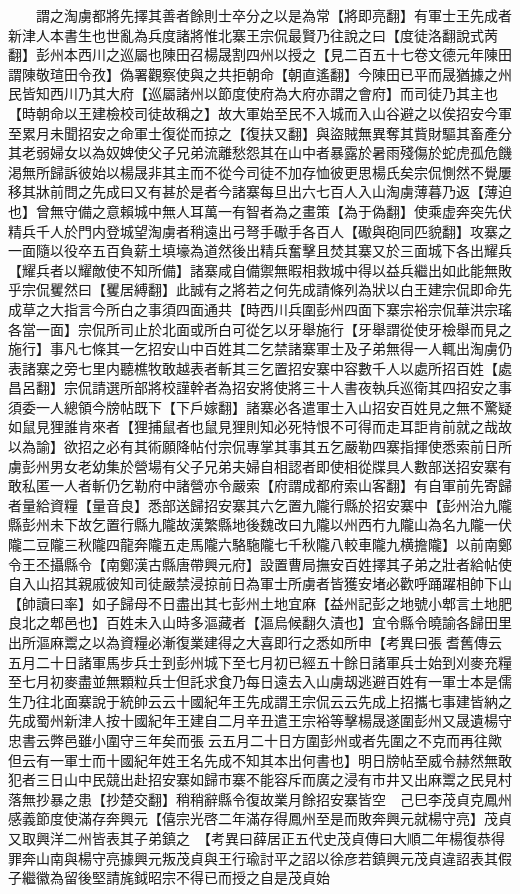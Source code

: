 　　謂之淘虜都將先擇其善者餘則士卒分之以是為常【將即亮翻】有軍士王先成者新津人本書生也世亂為兵度諸將惟北寨王宗侃最賢乃往說之曰【度徒洛翻說式苪翻】彭州本西川之巡屬也陳田召楊晟割四州以授之【見二百五十七卷文德元年陳田謂陳敬瑄田令孜】偽署觀察使與之共拒朝命【朝直遙翻】今陳田已平而晟猶據之州民皆知西川乃其大府【巡屬諸州以節度使府為大府亦謂之會府】而司徒乃其主也【時朝命以王建檢校司徒故稱之】故大軍始至民不入城而入山谷避之以俟招安今軍至累月未聞招安之命軍士復從而掠之【復扶又翻】與盜賊無異奪其貲財驅其畜產分其老弱婦女以為奴婢使父子兄弟流離愁怨其在山中者暴露於暑雨殘傷於蛇虎孤危饑渇無所歸訴彼始以楊晟非其主而不從今司徒不加存恤彼更思楊氏矣宗侃惻然不覺屢移其牀前問之先成曰又有甚於是者今諸寨每旦出六七百人入山淘虜薄暮乃返【薄迫也】曾無守備之意賴城中無人耳萬一有智者為之畫策【為于偽翻】使乘虚奔突先伏精兵千人於門内登城望淘虜者稍遠出弓弩手礮手各百人【礮與砲同匹貌翻】攻寨之一面隨以役卒五百負薪土填壕為道然後出精兵奮擊且焚其寨又於三面城下各出耀兵【耀兵者以耀敵使不知所備】諸寨咸自備禦無暇相救城中得以益兵繼出如此能無敗乎宗侃矍然曰【矍居縛翻】此誠有之將若之何先成請條列為狀以白王建宗侃即命先成草之大指言今所白之事須四面通共【時西川兵圍彭州四面下寨宗裕宗侃華洪宗瑤各當一面】宗侃所司止於北面或所白可從乞以牙舉施行【牙舉謂從使牙檢舉而見之施行】事凡七條其一乞招安山中百姓其二乞禁諸寨軍士及子弟無得一人輒出淘虜仍表諸寨之旁七里内聽樵牧敢越表者斬其三乞置招安寨中容數千人以處所招百姓【處昌呂翻】宗侃請選所部將校謹幹者為招安將使將三十人書夜執兵巡衛其四招安之事須委一人總領今牓帖既下【下戶嫁翻】諸寨必各遣軍士入山招安百姓見之無不驚疑如鼠見狸誰肯來者【狸捕鼠者也鼠見狸則知必死特恨不可得而走耳詎肯前就之哉故以為諭】欲招之必有其術願降帖付宗侃專掌其事其五乞嚴勒四寨指揮使悉索前日所虜彭州男女老幼集於營場有父子兄弟夫婦自相認者即使相從牒具人數部送招安寨有敢私匿一人者斬仍乞勒府中諸營亦令嚴索【府謂成都府索山客翻】有自軍前先寄歸者量給資糧【量音良】悉部送歸招安寨其六乞置九隴行縣於招安寨中【彭州治九隴縣彭州未下故乞置行縣九隴故漢繁縣地後魏改曰九隴以州西冇九隴山為名九隴一伏隴二豆隴三秋隴四龍奔隴五走馬隴六駱駞隴七千秋隴八較車隴九横擔隴】以前南鄭令王丕攝縣令【南鄭漢古縣唐帶興元府】設置曹局撫安百姓擇其子弟之壯者給帖使自入山招其親戚彼知司徒嚴禁浸掠前日為軍士所虜者皆獲安堵必歡呼踊躍相帥下山【帥讀曰率】如子歸母不日盡出其七彭州土地宜麻【益州記彭之地號小郫言土地肥良北之郫邑也】百姓未入山時多漚藏者【漚烏候翻久漬也】宜令縣令曉諭各歸田里出所漚麻鬻之以為資糧必漸復業建得之大喜即行之悉如所申【考異曰張耆舊傳云五月二十日諸軍馬步兵士到彭州城下至七月初已經五十餘日諸軍兵士始到刈麥充糧至七月初麥盡並無顆粒兵士但託求食乃每日遠去入山虜刼逃避百姓有一軍士本是儒生乃往北面寨說于統帥云云十國紀年王先成謂王宗侃云云先成上招攜七事建皆納之先成蜀州新津人按十國紀年王建自二月辛丑遣王宗裕等擊楊晟遂圍彭州又晟遺楊守忠書云弊邑雖小圍守三年矣而張云五月二十日方圍彭州或者先圍之不克而再往歟但云有一軍士而十國紀年姓王名先成不知其本出何書也】明日牓帖至威令赫然無敢犯者三日山中民競出赴招安寨如歸市寨不能容斥而廣之浸有市井又出麻鬻之民見村落無抄暴之患【抄楚交翻】稍稍辭縣令復故業月餘招安寨皆空　己巳李茂貞克鳳州感義節度使滿存奔興元【僖宗光啓二年滿存得鳳州至是而敗奔興元就楊守亮】茂貞又取興洋二州皆表其子弟鎮之　【考異曰薛居正五代史茂貞傳曰大順二年楊復恭得罪奔山南與楊守亮據興元叛茂貞與王行瑜討平之詔以徐彦若鎮興元茂貞違詔表其假子繼徽為留後堅請旄鉞昭宗不得已而授之自是茂貞始